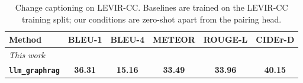 \begin{table}[t]
\centering
\caption{Change captioning on LEVIR-CC. Baselines are trained on the LEVIR-CC training split; our conditions are zero-shot apart from the pairing head.}
\label{tab:levir_cc_caption}
\setlength{\tabcolsep}{3pt}
\begin{tabular}{lccccc}
\toprule
Method & BLEU-1 & BLEU-4 & METEOR & ROUGE-L & CIDEr-D \\
\midrule
\midrule
\multicolumn{6}{l}{\emph{This work}} \\
\textbf{\texttt{llm\_graphrag}} & \textbf{36.31} & \textbf{15.16} & \textbf{33.49} & \textbf{33.96} & \textbf{40.15} \\
\bottomrule
\end{tabular}
\end{table}

